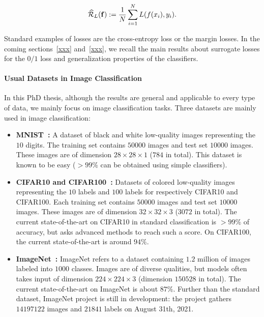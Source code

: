 \begin{align*}
\widehat{\mathcal{R}}_{L}(\mathbf{f}):= \frac{1}{N}\sum_{i=1}^N L(f(x_i),y_i).
\end{align*}

Standard examples of losses are the cross-entropy loss or the margin losses. In the coming sections~\ref{xxx} and~\ref{xxx}, we recall the main results about surrogate losses for the $0/1$ loss and generalization properties of the classifiers.



\paragraph{Usual Datasets in Image Classification}
In this PhD thesis, although the results are general and applicable to every type of data, we mainly focus on image classification tasks. Three datasets are mainly used in image classification:
\begin{itemize}
    \item \textbf{MNIST~\citep{lecun1998mnist}:} A dataset of black and white low-quality images representing the $10$ digits. The training set contains $50000$ images and test set $10000$ images. These images are of dimension $28\times28\times 1$ ($784$ in total). This dataset is known to be easy ($>99\%$ can be obtained using simple classifiers). 
    \item \textbf{CIFAR10 and CIFAR100~\citep{krizhevsky2009learning}:} Datasets of colored low-quality images representing the $10$ labels and $100$ labels for respectively CIFAR10 and CIFAR100. Each training set contains $50000$ images and test set $10000$ images. These images are of dimension $32\times32\times 3$ ($3072$ in total). The current state-of-the-art on CIFAR10 in standard classification is $>99\%$ of accuracy, but asks advanced methods to reach such a score. On CIFAR100, the current state-of-the-art is around $94\%$. 
    \item \textbf{ImageNet~\citep{imagenet_cvpr09}:} ImageNet refers to a dataset containing $1.2$ million of images labeled into $1000$ classes. Images are of diverse qualities, but models often takes input of dimension $224\times224\times 3$ (dimension $150528$ in total). The current state-of-the-art on ImageNet is about $87\%$. Further than the standard dataset, ImageNet project is still in development: the project gathers $14197122$ images and $21841$ labels on August 31th, 2021.   


\end{itemize}

